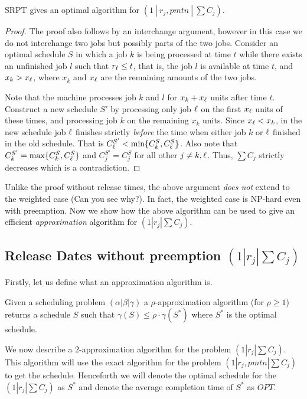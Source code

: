 \documentclass[11pt]{article}
\begin{document}
\begin{theorem}
SRPT gives an optimal algorithm for $(1~|~r_j,pmtn~|~\sum C_j)$.
\end{theorem}
\begin{proof}
The proof also follows by an interchange argument, however in this case we do not interchange two jobs but possibly parts of the two jobs.
Consider an optimal schedule $S$ in which a job $k$ is being processed at time $t$ while there exists an unfinished job $l$ such that $r_\ell \le t$, that is,
the job $l$ is available at time $t$, and $x_k > x_\ell$, where $x_k$ and $x_\ell$ are the remaining amounts of the two jobs.

Note that the machine processes job $k$ and $l$ for $x_k + x_\ell$ units after time $t$. Construct a new schedule $S'$ by processing only job $\ell$ on the first $x_\ell$ units of these times, and processing job $k$ on the remaining $x_k$ units. Since $x_\ell < x_k$, in the new schedule job $\ell$ finishes 
strictly {\em before} the time when either job $k$ or $\ell$ finished in the old schedule. That is $C^{S'}_\ell < \min\{C^S_k,C^S_\ell\}$. Also note that
$C^{S'}_k = \max \{C^S_k,C^S_\ell\}$ and $C^{S'}_j = C^S_j$ for all other $j\neq k,\ell$. Thus, $\sum C_j$ strictly decreases which is a contradiction.
\end{proof}

Unlike the proof without release times, the above argument {\em does not} extend to the weighted case (Can you see why?). In fact, the weighted 
case is NP-hard even with preemption. Now we show how the above algorithm can be used to give an efficient {\em approximation} algorithm for
$(1|r_j|\sum C_j)$.

\subsection{Release Dates without preemption $(1|r_j|\sum C_j)$}
Firstly, let us define what an approximation algorithm is.
\begin{definition}
Given a scheduling problem $(\alpha|\beta|\gamma)$ a $\rho$-approximation algorithm (for $\rho \ge 1$) returns a schedule 
$S$ such that $\gamma(S) \le \rho\cdot\gamma(S^*)$ where $S^*$ is the optimal schedule.
\end{definition}

We now describe a $2$-approximation algorithm for the problem $(1|r_j|\sum C_j)$. This algorithm will use the exact algorithm for the
problem $(1|r_j,pmtn|\sum C_j)$ to get the schedule. Henceforth we will denote the optimal schedule for the $(1|r_j|\sum C_j)$ as $S^*$
and denote the average completion time of $S^*$ as $OPT$. 
\end{document}
